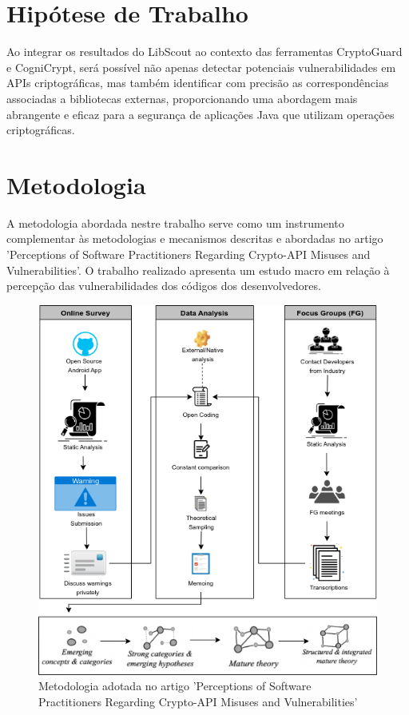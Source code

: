 \section{Hipótese de Trabalho}

Ao integrar os resultados do LibScout ao contexto das ferramentas CryptoGuard e CogniCrypt, será possível não apenas detectar potenciais vulnerabilidades em APIs criptográficas, mas também identificar com precisão as correspondências associadas a bibliotecas externas, proporcionando uma abordagem mais abrangente e eficaz para a segurança de aplicações Java que utilizam operações criptográficas.

\section{Metodologia}

A metodologia abordada nestre trabalho serve como um instrumento complementar às metodologias e mecanismos descritas e abordadas no artigo 'Perceptions of Software Practitioners Regarding Crypto-API Misuses and Vulnerabilities'. \cite{perception_developers}
O trabalho realizado \cite{perception_developers} apresenta um estudo macro em relação à percepção das vulnerabilidades dos códigos dos desenvolvedores.

\begin{figure}[!ht]
  \centering
  \includegraphics[scale=0.5]{img/metodologia.png}
  \caption{Metodologia adotada no artigo 'Perceptions of Software Practitioners Regarding Crypto-API Misuses and Vulnerabilities'}
  \label{averageWarnings}
\end{figure}


